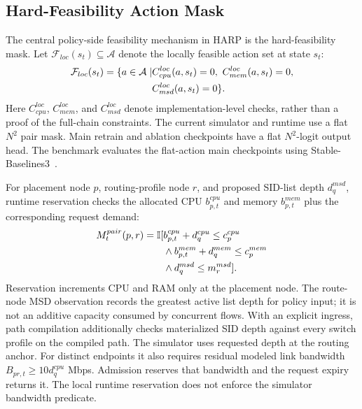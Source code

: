 \documentclass[final,5p]{elsarticle}
\newcommand{\rev}[1]{\textcolor{revisiongreen}{#1}}
\let\newrev\rev
\begin{document}
\subsection{Hard-Feasibility Action Mask}
\label{subsec:harp_masking}

The central \rev{policy-side feasibility mechanism} in HARP is the hard-feasibility mask. Let \(\mathcal{F}_{loc}(s_t)\subseteq\mathcal{A}\) denote the \rev{locally feasible} action set at state \(s_t\):
\begin{equation}
\rev{\begin{aligned}
\mathcal{F}_{loc}(s_t)=\{a\in\mathcal A\mid
&C_{cpu}^{loc}(a,s_t)=0,\ C_{mem}^{loc}(a,s_t)=0,\\
&C_{msd}^{loc}(a,s_t)=0\}.
\end{aligned}}
\label{eq:feasible_set}
\end{equation}
Here \(C_{cpu}^{loc}\), \(C_{mem}^{loc}\), and \(C_{msd}^{loc}\) denote implementation-level checks, rather than a proof of the full-chain constraints. The current simulator and runtime use a flat \(N^2\) pair mask. Main retrain and ablation checkpoints have a flat \(N^2\)-logit output head. \newrev{The benchmark evaluates the flat-action main checkpoints using Stable-Baselines3~\cite{raffin2021sb3}.}

\newrev{For placement node \(p\), routing-profile node \(r\), and proposed SID-list depth \(d_q^{msd}\), runtime reservation checks the allocated CPU \(b^{cpu}_{p,t}\) and memory \(b^{mem}_{p,t}\) plus the corresponding request demand:}
\begin{equation}
\color{revisiongreen}
\begin{aligned}
M^{pair}_t(p,r)=\mathbb I[&b^{cpu}_{p,t}+d_q^{cpu}\le c_p^{cpu}\\
&\land b^{mem}_{p,t}+d_q^{mem}\le c_p^{mem}\\
&\land d_q^{msd}\le m_r^{msd}].
\end{aligned}
\label{eq:runtime_pair_mask}
\end{equation}
\newrev{Reservation increments CPU and RAM only at the placement node. The route-node MSD observation records the greatest active list depth for policy input; it is not an additive capacity consumed by concurrent flows. With an explicit ingress, path compilation additionally checks materialized SID depth against every switch profile on the compiled path. The simulator uses requested depth at the routing anchor. For distinct endpoints it also requires residual modeled link bandwidth \(B_{pr,t}\ge 10d_q^{cpu}\) Mbps. Admission reserves that bandwidth and the request expiry returns it. The local runtime reservation does not enforce the simulator bandwidth predicate.}
\end{document}
